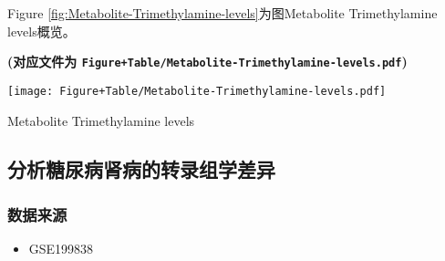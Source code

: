 \documentclass[
]{article}
\providecommand{\tightlist}{%
  \setlength{\itemsep}{0pt}\setlength{\parskip}{0pt}}
\begin{document}
Figure \ref{fig:Metabolite-Trimethylamine-levels}为图Metabolite Trimethylamine levels概览。

\textbf{(对应文件为 \texttt{Figure+Table/Metabolite-Trimethylamine-levels.pdf})}

\def\@captype{figure}
\begin{center}
\texttt{[image: Figure+Table/Metabolite-Trimethylamine-levels.pdf]}
\caption{Metabolite Trimethylamine levels}\label{fig:Metabolite-Trimethylamine-levels}
\end{center}

\hypertarget{ux5206ux6790ux7cd6ux5c3fux75c5ux80beux75c5ux7684ux8f6cux5f55ux7ec4ux5b66ux5deeux5f02}{%
\subsection{分析糖尿病肾病的转录组学差异}\label{ux5206ux6790ux7cd6ux5c3fux75c5ux80beux75c5ux7684ux8f6cux5f55ux7ec4ux5b66ux5deeux5f02}}

\hypertarget{ux6570ux636eux6765ux6e90-1}{%
\subsubsection{数据来源}\label{ux6570ux636eux6765ux6e90-1}}

\begin{itemize}
\tightlist
\item
  GSE199838
\end{itemize}
\end{document}
